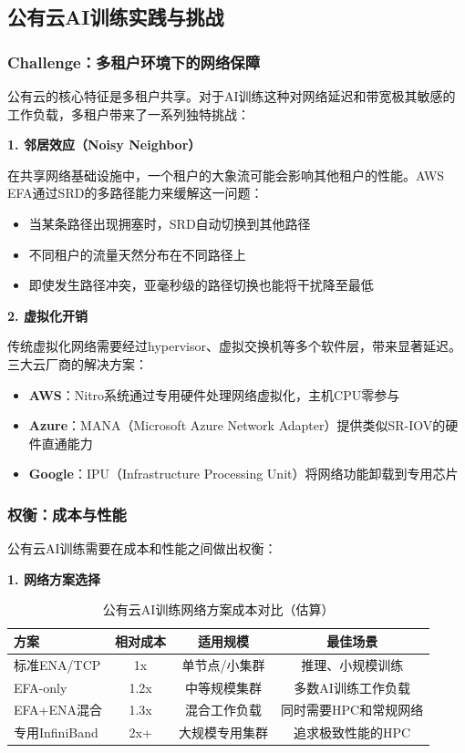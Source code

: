 \subsection{公有云AI训练实践与挑战}

\subsubsection{Challenge：多租户环境下的网络保障}

公有云的核心特征是多租户共享。对于AI训练这种对网络延迟和带宽极其敏感的工作负载，多租户带来了一系列独特挑战：

\textbf{1. 邻居效应（Noisy Neighbor）}

在共享网络基础设施中，一个租户的大象流可能会影响其他租户的性能。AWS EFA通过SRD的多路径能力来缓解这一问题：

\begin{itemize}
    \item 当某条路径出现拥塞时，SRD自动切换到其他路径
    \item 不同租户的流量天然分布在不同路径上
    \item 即使发生路径冲突，亚毫秒级的路径切换也能将干扰降至最低
\end{itemize}

\textbf{2. 虚拟化开销}

传统虚拟化网络需要经过hypervisor、虚拟交换机等多个软件层，带来显著延迟。三大云厂商的解决方案：

\begin{itemize}
    \item \textbf{AWS}：Nitro系统通过专用硬件处理网络虚拟化，主机CPU零参与
    \item \textbf{Azure}：MANA（Microsoft Azure Network Adapter）提供类似SR-IOV的硬件直通能力
    \item \textbf{Google}：IPU（Infrastructure Processing Unit）将网络功能卸载到专用芯片
\end{itemize}

\subsubsection{权衡：成本与性能}

公有云AI训练需要在成本和性能之间做出权衡：

\textbf{1. 网络方案选择}

\begin{table}[htbp]
\centering
\caption{公有云AI训练网络方案成本对比（估算）}
\begin{tabular}{lccc}
\toprule
\textbf{方案} & \textbf{相对成本} & \textbf{适用规模} & \textbf{最佳场景} \\
\midrule
标准ENA/TCP & 1x & 单节点/小集群 & 推理、小规模训练 \\
EFA-only & 1.2x & 中等规模集群 & 多数AI训练工作负载 \\
EFA+ENA混合 & 1.3x & 混合工作负载 & 同时需要HPC和常规网络 \\
专用InfiniBand & 2x+ & 大规模专用集群 & 追求极致性能的HPC \\
\bottomrule
\end{tabular}
\end{table}

